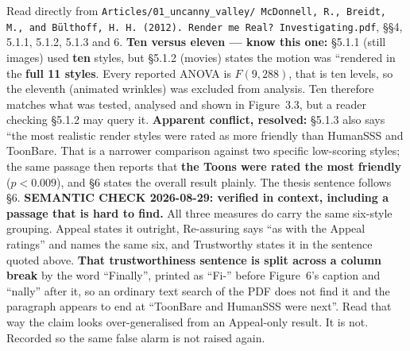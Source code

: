 \documentclass[11pt, a4paper]{article}
\begin{document}
\begin{Form}
  {Read directly from \texttt{\footnotesize Articles/01\_uncanny\_valley/ McDonnell, R., Breidt, M., and B{\"u}lthoff, H. H. (2012). Render me Real? Investigating.pdf}, \S\S4, 5.1.1, 5.1.2, 5.1.3 and 6. \textbf{Ten versus eleven --- know this one:} \S5.1.1 (still images) used \textbf{ten} styles, but \S5.1.2 (movies) states the motion was ``rendered in the \textbf{full 11 styles}. Every reported ANOVA is $F(9,288)$, that is ten levels, so the eleventh (animated wrinkles) was excluded from analysis. Ten therefore matches what was tested, analysed and shown in Figure~3.3, but a reader checking \S5.1.2 may query it. \textbf{Apparent conflict, resolved:} \S5.1.3 also says ``the most realistic render styles were rated as more friendly than HumanSSS and ToonBare. That is a narrower comparison against two specific low-scoring styles; the same passage then reports that \textbf{the Toons were rated the most friendly} ($p<0.009$), and \S6 states the overall result plainly. The thesis sentence follows \S6. \textbf{SEMANTIC CHECK 2026-08-29: verified in context, including a passage that is hard to find.} All three measures do carry the same six-style grouping. Appeal states it outright, Re-assuring says ``as with the Appeal ratings'' and names the same six, and Trustworthy states it in the sentence quoted above. \textbf{That trustworthiness sentence is split across a column break} by the word ``Finally'', printed as ``Fi-'' before Figure~6's caption and ``nally'' after it, so an ordinary text search of the PDF does not find it and the paragraph appears to end at ``ToonBare and HumanSSS were next''. Read that way the claim looks over-generalised from an Appeal-only result. It is not. Recorded so the same false alarm is not raised again.}



\end{Form}
\end{document}
